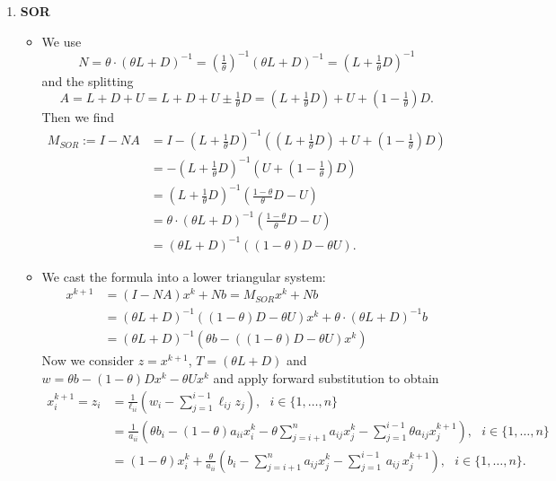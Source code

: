 {\begin{enumerate}
\begin{itemize}
	\begin{align*}
	x^{k+1}_i = z_i &=\frac{1}{\ell_{ii}}\left(w_i-\sum_{j=1}^{i-1}\ell_{ij}z_j\right),~~~i\in\{1,\ldots,n\} \\
	&=\frac{1}{a_{ii}}\left(b_i - \sum_{j=i+1}^{n}a_{ij}x^{k}_j-\sum_{j=1}^{i-1}a_{ij}x^{k+1}_j\right),~~~i\in\{1,\ldots,n\}.
	\end{align*}
	\end{itemize}
	\item \textbf{SOR}
	\begin{itemize}
		 \item We use 
		 $$N=\theta\cdot(\theta L+D)^{-1} 
		 =\left(\tfrac{1}{\theta}\right)^{-1}( \theta L+ D) ^{-1} 
		 =\left(   L+ \tfrac{1}{\theta}D\right)^{-1}$$ 
		 and the splitting
		 $$A=L+D+U =L+D+U\pm \tfrac{1}{\theta}D 
		 =  (L+ \tfrac{1}{\theta}D) + U + (1-\tfrac{1}{\theta})D.$$ 
		 Then we find
	    \begin{align*}
	    M_{SOR} := I-NA &=  I - \left(   L+ \tfrac{1}{\theta}D\right)^{-1} \left( (L+ \tfrac{1}{\theta}D) + U + (1-\tfrac{1}{\theta})D\right)\\
	    &= - \left(   L+ \tfrac{1}{\theta}D\right)^{-1} \left(U + (1-\tfrac{1}{\theta})D\right)\\
	    &=\left(   L+ \tfrac{1}{\theta}D\right)^{-1} \left( \tfrac{1-\theta}{\theta}D - U\right)\\
	    &=\theta\cdot(\theta L+D)^{-1}  \left( \tfrac{1-\theta}{\theta}D - U\right) \\
	    &= (\theta L+D)^{-1}  \left( (1-\theta)D - \theta U\right) .
	    \end{align*} 
	    \item We cast the formula into a lower triangular system:
	    \begin{align*}
	    x^{k+1} &=  (I-NA)x^k + Nb   =M_{SOR}x^k + Nb\\
	    & = (\theta L+D)^{-1}  \left( (1-\theta)D - \theta U\right) x^k + \theta\cdot(\theta L+D)^{-1} b\\
	    & = (\theta L+D)^{-1}(\theta b-((1-\theta)D - \theta U) x^k)
	    \end{align*}
   		Now we consider $z= x^{k+1}$, $T=(\theta L+D)$ and $w = \theta b- (1-\theta)Dx^k - \theta U  x^k$ and apply forward substitution to obtain
	    \begin{align*}
	    x^{k+1}_i = z_i &=\frac{1}{\ell_{ii}}\left(w_i-\sum_{j=1}^{i-1}\ell_{ij}z_j\right),~~~i\in\{1,\ldots,n\} \\
	    &=\frac{1}{a_{ii}}\left(\theta b_i - (1-\theta)a_{ii}x_i^k - \theta \sum_{j=i+1}^{n}a_{ij}x^{k}_j-\sum_{j=1}^{i-1}\theta a_{ij}x^{k+1}_j\right),~~~i\in\{1,\ldots,n\}\\
	    	    &=(1-\theta)x_i^k+   \frac{\theta}{a_{ii}}\left( b_i-  \sum\limits^n_{j = i+1} a_{ij}x^k_j  - \sum\limits^{i-1}_{j=1} \,a_{ij} \, x_j^{k+1}  \right),~~~i\in\{1,\ldots,n\}.
	    \end{align*}
	\end{itemize}
\end{enumerate}

}
